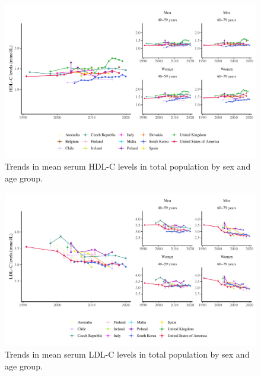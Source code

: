 \documentclass[12pt]{article}
\begin{document}
\begin{appendix}
\begin{refsection}
\begin{landscape}
        \begin{figure}[H]
            \centering
            \includegraphics[width=\linewidth]{../3_figures/hdl.pdf}
            \caption{Trends in mean serum HDL-C levels in total population by sex and age group.}
            \label{fig:hdl}
        \end{figure}

        \begin{figure}[H]
            \centering
            \includegraphics[width=\linewidth]{../3_figures/ldl.pdf}
            \caption{Trends in mean serum LDL-C levels in total population by sex and age group.}
            \label{fig:ldl}
        \end{figure}



\end{landscape}
\end{refsection}
\end{appendix}
\end{document}
